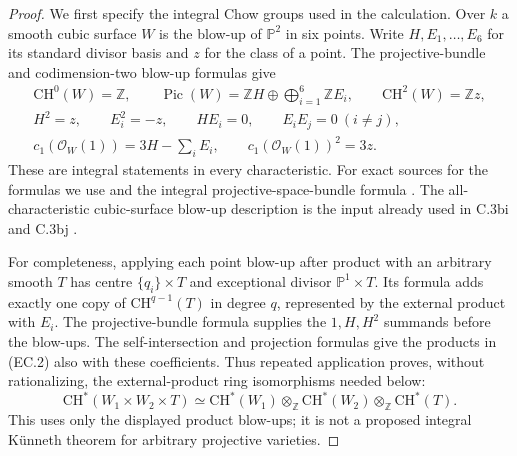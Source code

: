 \begin{proof}
We first specify the integral Chow groups used in the calculation.
Over $k$ a smooth cubic surface $W$ is the blow-up of $\mathbb P^2$
in six points. Write $H,E_1,\ldots,E_6$ for its standard divisor
basis and $z$ for the class of a point. The projective-bundle and
codimension-two blow-up formulas give
\[
 \begin{gathered}
 \mathrm{CH}^0(W)=\mathbb Z,\qquad
 \operatorname{Pic}(W)=\mathbb ZH\oplus\bigoplus_{i=1}^6\mathbb ZE_i,
 \qquad\mathrm{CH}^2(W)=\mathbb Zz,\\
 H^2=z,\qquad E_i^2=-z,\qquad H E_i=0,
 \qquad E_iE_j=0\ (i\ne j),\\
 c_1(\mathcal O_W(1))=3H-\sum_iE_i,
 \qquad c_1(\mathcal O_W(1))^2=3z.
 \end{gathered}
 \tag{EC.2}
\]
These are integral statements in every characteristic.
For exact sources for the formulas we use
\citet[Theorems 2.4 and 2.8(3), with the displayed maps]{cyJiang2023}
and the integral projective-space-bundle formula
\citep[Lemma 42.36.2, Tag 02TX]{cyStacksProject}.
The all-characteristic cubic-surface blow-up description is the
input already used in C.3bi and C.3bj
\citep[Chapter 4, Proposition 2.4, p.~178]{D_HuybrechtsCubics}.

For completeness, applying each point blow-up after product with an
arbitrary smooth $T$ has centre $\{q_i\}\times T$ and exceptional
divisor $\mathbb P^1\times T$. Its formula adds exactly one copy of
$\mathrm{CH}^{q-1}(T)$ in degree $q$, represented by the external
product with $E_i$. The projective-bundle formula supplies the
$1,H,H^2$ summands before the blow-ups. The self-intersection and
projection formulas give the products in (EC.2) also with these
coefficients. Thus repeated application proves, without rationalizing,
the external-product ring isomorphisms needed below:
\[
 \mathrm{CH}^*(W_1\times W_2\times T)
  \simeq\mathrm{CH}^*(W_1)\otimes_{\mathbb Z}
        \mathrm{CH}^*(W_2)\otimes_{\mathbb Z}\mathrm{CH}^*(T).
 \tag{EC.3}
\]
This uses only the displayed product blow-ups; it is not a proposed
integral K\"unneth theorem for arbitrary projective varieties.


\end{proof}

